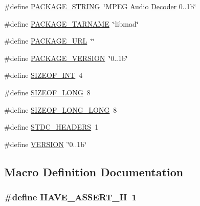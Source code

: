 \begin{DoxyCompactItemize}
\item 
\#define \hyperlink{mac_2config_2i386_2lib-src_2libmad_2config_8h_ac73e6f903c16eca7710f92e36e1c6fbf}{P\+A\+C\+K\+A\+G\+E\+\_\+\+S\+T\+R\+I\+NG}~\char`\"{}M\+P\+EG Audio \hyperlink{class_decoder}{Decoder} 0..\+1b\char`\"{}
\item 
\#define \hyperlink{mac_2config_2i386_2lib-src_2libmad_2config_8h_af415af6bfede0e8d5453708afe68651c}{P\+A\+C\+K\+A\+G\+E\+\_\+\+T\+A\+R\+N\+A\+ME}~\char`\"{}libmad\char`\"{}
\item 
\#define \hyperlink{mac_2config_2i386_2lib-src_2libmad_2config_8h_a5c93853116d5a50307b6744f147840aa}{P\+A\+C\+K\+A\+G\+E\+\_\+\+U\+RL}~\char`\"{}\char`\"{}
\item 
\#define \hyperlink{mac_2config_2i386_2lib-src_2libmad_2config_8h_aa326a05d5e30f9e9a4bb0b4469d5d0c0}{P\+A\+C\+K\+A\+G\+E\+\_\+\+V\+E\+R\+S\+I\+ON}~\char`\"{}0..\+1b\char`\"{}
\item 
\#define \hyperlink{mac_2config_2i386_2lib-src_2libmad_2config_8h_a44184cf844a916eee78598ab35fc966b}{S\+I\+Z\+E\+O\+F\+\_\+\+I\+NT}~4
\item 
\#define \hyperlink{mac_2config_2i386_2lib-src_2libmad_2config_8h_a22aece5d034fd9040a3d01c3797fdfe7}{S\+I\+Z\+E\+O\+F\+\_\+\+L\+O\+NG}~8
\item 
\#define \hyperlink{mac_2config_2i386_2lib-src_2libmad_2config_8h_acd1ddb89a6f7f17d1c152499173c3eef}{S\+I\+Z\+E\+O\+F\+\_\+\+L\+O\+N\+G\+\_\+\+L\+O\+NG}~8
\item 
\#define \hyperlink{mac_2config_2i386_2lib-src_2libmad_2config_8h_a550e5c272cc3cf3814651721167dcd23}{S\+T\+D\+C\+\_\+\+H\+E\+A\+D\+E\+RS}~1
\item 
\#define \hyperlink{mac_2config_2i386_2lib-src_2libmad_2config_8h_a1c6d5de492ac61ad29aec7aa9a436bbf}{V\+E\+R\+S\+I\+ON}~\char`\"{}0..\+1b\char`\"{}
\end{DoxyCompactItemize}


\subsection{Macro Definition Documentation}
\subsubsection[{\texorpdfstring{H\+A\+V\+E\+\_\+\+A\+S\+S\+E\+R\+T\+\_\+H}{HAVE_ASSERT_H}}]{\setlength{\rightskip}{0pt plus 5cm}\#define H\+A\+V\+E\+\_\+\+A\+S\+S\+E\+R\+T\+\_\+H~1}\hypertarget{mac_2config_2i386_2lib-src_2libmad_2config_8h_ad0eabe2e5407bc73450eb15b657983cd}{}\label{mac_2config_2i386_2lib-src_2libmad_2config_8h_ad0eabe2e5407bc73450eb15b657983cd}


